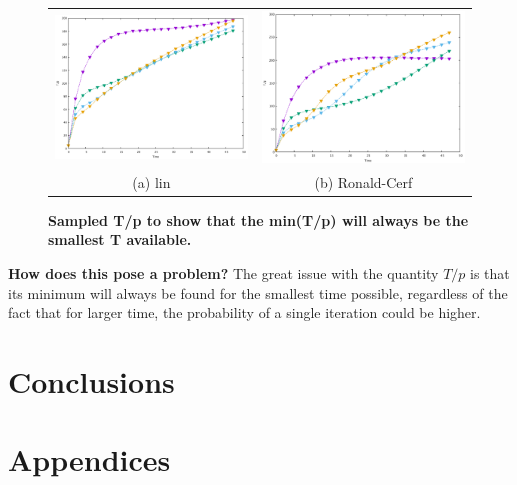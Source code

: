 \documentclass[11pt, twoside]{report}
\begin{document}
\begin{figure}[!ht]
\centering
\begin{tabular}{cc}
  \includegraphics[width=75mm]{./figures/sampled_t_over_p/T_p_lin.pdf} &   \includegraphics[width=75mm]{./figures/sampled_t_over_p/T_p_cerf.pdf} \\
(a) lin & (b) Ronald-Cerf\\[6pt]
\end{tabular}
\caption[Sampled T/p ]{\textbf{Sampled T/p to show that the min(T/p) will always be the smallest T available.}}
\end{figure}

 \textbf{How does this pose a problem?} The great issue with the quantity $T/p$ is that its minimum will always be found for the smallest time possible, regardless of the fact that for larger time, the probability of a single iteration could be higher.




\newpage
\chapter*{Conclusions}

\newpage
\chapter*{Appendices}
\end{document}
